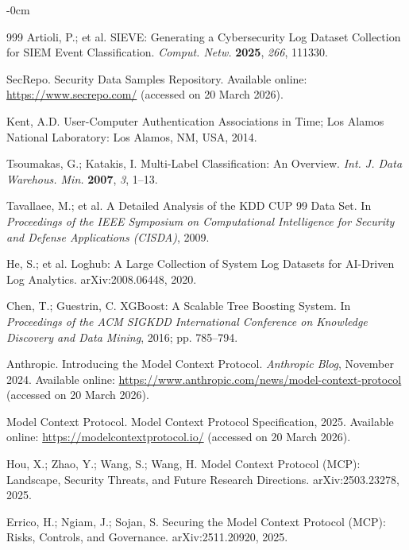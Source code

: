 \documentclass[futureinternet,article,submit,pdftex,moreauthors]{Definitions/mdpi}
\begin{document}
\begin{adjustwidth}{-\extralength}{0cm}
\begin{thebibliography}{999}
Artioli, P.; et al. SIEVE: Generating a Cybersecurity Log Dataset Collection for SIEM
Event Classification. \textit{Comput. Netw.} \textbf{2025}, \textit{266}, 111330.

SecRepo. Security Data Samples Repository. Available online:
\url{https://www.secrepo.com/} (accessed on 20 March 2026).

Kent, A.D. User-Computer Authentication Associations in Time; Los Alamos National
Laboratory: Los Alamos, NM, USA, 2014.

Tsoumakas, G.; Katakis, I. Multi-Label Classification: An Overview.
\textit{Int. J. Data Warehous. Min.} \textbf{2007}, \textit{3}, 1--13.

Tavallaee, M.; et al. A Detailed Analysis of the KDD CUP 99 Data Set.
In \textit{Proceedings of the IEEE Symposium on Computational Intelligence for Security and
Defense Applications (CISDA)}, 2009.

He, S.; et al. Loghub: A Large Collection of System Log Datasets for AI-Driven Log Analytics.
arXiv:2008.06448, 2020.

Chen, T.; Guestrin, C. XGBoost: A Scalable Tree Boosting System.
In \textit{Proceedings of the ACM SIGKDD International Conference on Knowledge Discovery and
Data Mining}, 2016; pp. 785--794.

Anthropic. Introducing the Model Context Protocol. \textit{Anthropic Blog}, November 2024.
Available online: \url{https://www.anthropic.com/news/model-context-protocol}
(accessed on 20 March 2026).

Model Context Protocol. Model Context Protocol Specification, 2025.
Available online: \url{https://modelcontextprotocol.io/} (accessed on 20 March 2026).

Hou, X.; Zhao, Y.; Wang, S.; Wang, H. Model Context Protocol (MCP): Landscape, Security Threats, and Future
Research Directions. arXiv:2503.23278, 2025.

Errico, H.; Ngiam, J.; Sojan, S. Securing the Model Context Protocol (MCP): Risks, Controls, and
Governance. arXiv:2511.20920, 2025.

\end{thebibliography}

\PublishersNote{}
\end{adjustwidth}
\end{document}
